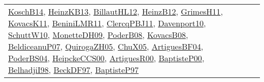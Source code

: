 {\begin{longtable}{lp{3cm}>{\raggedright}p{6cm}>{\raggedright}p{6cm}p{8cm}}
\href{papers/KoschB14.pdf}{KoschB14}\cite{KoschB14}, \href{papers/HeinzKB13.pdf}{HeinzKB13}\cite{HeinzKB13}, \href{papers/BillautHL12.pdf}{BillautHL12}\cite{BillautHL12}, \href{papers/HeinzB12.pdf}{HeinzB12}\cite{HeinzB12}, \href{papers/GrimesH11.pdf}{GrimesH11}\cite{GrimesH11}, \href{articles/KovacsK11.pdf}{KovacsK11}\cite{KovacsK11}, \href{articles/BeniniLMR11.pdf}{BeniniLMR11}\cite{BeniniLMR11}, \href{papers/ClercqPBJ11.pdf}{ClercqPBJ11}\cite{ClercqPBJ11}, \href{papers/Davenport10.pdf}{Davenport10}\cite{Davenport10}, \href{papers/SchuttW10.pdf}{SchuttW10}\cite{SchuttW10}, \href{papers/MonetteDH09.pdf}{MonetteDH09}\cite{MonetteDH09}, \href{papers/PoderB08.pdf}{PoderB08}\cite{PoderB08}, \href{articles/KovacsB08.pdf}{KovacsB08}\cite{KovacsB08}, \href{papers/BeldiceanuP07.pdf}{BeldiceanuP07}\cite{BeldiceanuP07}, \href{papers/QuirogaZH05.pdf}{QuirogaZH05}\cite{QuirogaZH05}, \href{papers/ChuX05.pdf}{ChuX05}\cite{ChuX05}, \href{papers/ArtiguesBF04.pdf}{ArtiguesBF04}\cite{ArtiguesBF04}, \href{articles/PoderBS04.pdf}{PoderBS04}\cite{PoderBS04}, \href{articles/HeipckeCCS00.pdf}{HeipckeCCS00}\cite{HeipckeCCS00}, \href{articles/ArtiguesR00.pdf}{ArtiguesR00}\cite{ArtiguesR00}, \href{articles/BaptisteP00.pdf}{BaptisteP00}\cite{BaptisteP00}, \href{articles/BelhadjiI98.pdf}{BelhadjiI98}\cite{BelhadjiI98}, \href{papers/BeckDF97.pdf}{BeckDF97}\cite{BeckDF97}, \href{papers/BaptisteP97.pdf}{BaptisteP97}\cite{BaptisteP97}\\

\end{longtable}}
